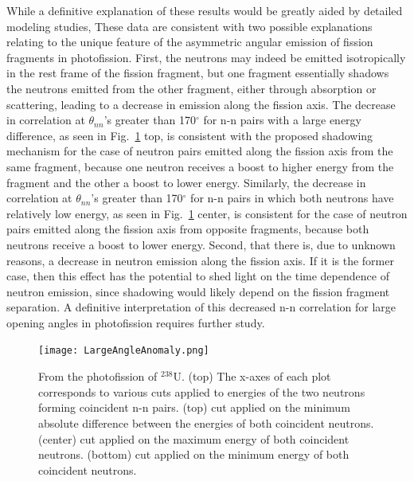While a definitive explanation of these results would be greatly aided by detailed modeling studies,
These data are consistent with two possible explanations relating to the unique feature of the asymmetric angular emission of fission fragments in photofission.
First, the neutrons may indeed be emitted isotropically in the rest frame of the fission fragment, but one fragment essentially shadows the neutrons emitted from the other fragment, either through absorption or scattering, leading to a decrease in emission along the fission axis.
The decrease in correlation at $\theta_{nn}$'s greater than 170$^{\circ}$ for n-n pairs with a large energy difference, as seen in Fig.~\ref{fig:LargeAngleAnomaly} top, is consistent with the proposed shadowing mechanism for the case of neutron pairs emitted along the fission axis from the same fragment, because one neutron receives a boost to higher energy from the fragment and the other a boost to lower energy.
Similarly, the decrease in correlation at $\theta_{nn}$'s greater than 170$^{\circ}$ for n-n pairs in which both neutrons have relatively low energy, as seen in Fig.~\ref{fig:LargeAngleAnomaly} center, is consistent for the case of neutron pairs emitted along the fission axis from opposite fragments, because both neutrons receive a boost to lower energy.
Second, that there is, due to unknown reasons, a decrease in neutron emission along the fission axis.
If it is the former case, then this effect has the potential to shed light on the time dependence of neutron emission, since shadowing would likely depend on the fission fragment separation.
A definitive interpretation of this decreased n-n correlation for large opening angles in photofission requires further study.

\begin{figure}
\centering
    \texttt{[image: LargeAngleAnomaly.png]}
    \caption{From the photofission of $^{238}$U. (top) The x-axes of each plot corresponds to various cuts applied to energies of the two neutrons forming coincident n-n pairs.
     (top) cut applied on the minimum absolute difference between the energies of both coincident neutrons. (center) cut applied on the maximum energy of both coincident neutrons. (bottom) cut applied on the minimum energy of both coincident neutrons. }
    \label{fig:LargeAngleAnomaly}
\end{figure}


